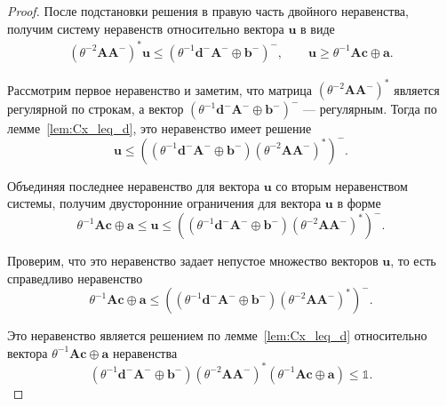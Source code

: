 \documentclass[specialist,
               substylefile = spbu.rtx,
               subf,href,colorlinks=true, 12pt]{disser}
\theoremstyle{definition}
\begin{document}
\begin{proof}
После подстановки решения в правую часть двойного неравенства, получим систему неравенств относительно вектора $\bm{u}$ в виде
\begin{gather*}
(\theta^{-2}\bm{A}\bm{A}^{-})^{\ast}\bm{u}
\leq
(\theta^{-1}\bm{d}^{-}\bm{A}^{-}\oplus\bm{b}^{-})^{-},
\qquad
\bm{u}
\geq
\theta^{-1}\bm{A}\bm{c}
\oplus
\bm{a}.
\end{gather*}

Рассмотрим первое неравенство и заметим, что матрица $(\theta^{-2}\bm{A}\bm{A}^{-})^{\ast}$ является регулярной по строкам, а вектор $(\theta^{-1}\bm{d}^{-}\bm{A}^{-}\oplus\bm{b}^{-})^{-}$ --- регулярным. Тогда по лемме~\ref{lem:Cx_leq_d}, это неравенство имеет решение
\begin{equation*}
\bm{u}
\leq
((\theta^{-1}\bm{d}^{-}\bm{A}^{-}\oplus\bm{b}^{-})(\theta^{-2}\bm{A}\bm{A}^{-})^{\ast})^{-}.
\end{equation*}

Объединяя последнее неравенство для вектора $\bm{u}$ со вторым неравенством системы, получим двусторонние ограничения для вектора $\bm{u}$ в форме
\begin{equation*}
\theta^{-1}\bm{A}\bm{c}
\oplus
\bm{a}
\leq
\bm{u}
\leq
((\theta^{-1}\bm{d}^{-}\bm{A}^{-}\oplus\bm{b}^{-})(\theta^{-2}\bm{A}\bm{A}^{-})^{\ast})^{-}.
\end{equation*}

Проверим, что это неравенство задает непустое множество векторов $\bm{u}$, то есть справедливо неравенство
\begin{equation*}
\theta^{-1}\bm{A}\bm{c}
\oplus
\bm{a}
\leq
((\theta^{-1}\bm{d}^{-}\bm{A}^{-}\oplus\bm{b}^{-})(\theta^{-2}\bm{A}\bm{A}^{-})^{\ast})^{-}.
\end{equation*}

Это неравенство является решением по лемме~\ref{lem:Cx_leq_d} относительно вектора $\theta^{-1}\bm{A}\bm{c}\oplus\bm{a}$  неравенства
\begin{equation*}
(\theta^{-1}\bm{d}^{-}\bm{A}^{-}\oplus\bm{b}^{-})
(\theta^{-2}\bm{A}\bm{A}^{-})^{\ast}
(\theta^{-1}\bm{A}\bm{c}\oplus\bm{a})
\leq
\mathbb{1}.
\end{equation*}


\end{proof}
\end{document}
